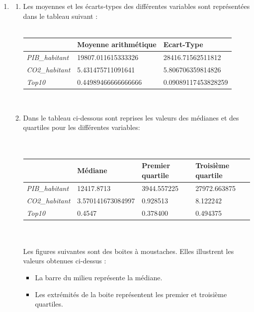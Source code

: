 \documentclass[a4paper, 11pt]{article}
\begin{document}
\begin{enumerate}[label=(\alph*)]
    \item
    \begin{enumerate}[label=\roman*.]
        \item Les moyennes et les écarts-types des différentes variables sont représentées dans le tableau suivant :\\\\ 
        \begin{tabular}{|p{4cm}||p{4cm}|p{4cm}|}
        \hline
             & \textbf{Moyenne arithmétique} & \textbf{Ecart-Type}\\
             \hline \hline
              \textit{PIB\_habitant} &  19807.011615333326 & 28416.71562511812\\
              \hline
              \textit{CO2\_habitant} & 5.431475711091641 & 5.806706359814826\\
              \hline
              \textit{Top10} & 0.44989466666666666 & 0.09089117453828259\\
              \hline
        \end{tabular}\\
        \item Dans le tableau ci-dessous sont reprises les valeurs des médianes et des quartiles pour les différentes variables: \\\\\
        \begin{tabular}{|p{2.5cm}||p{3cm}|p{3cm}|p{3cm}|}
        \hline
             &  \textbf{Médiane}& \textbf{Premier quartile} &  \textbf{Troisième quartile}\\
             \hline \hline
             \textit{PIB\_habitant} &  12417.8713 &   3944.557225 & 27972.663875\\
             \hline
             \textit{CO2\_habitant}&  3.570141673084997 & 0.928513 & 8.122242
              \\
             \hline
             \textit{Top10}&  0.4547 &   0.378400 &   0.494375 \\
             \hline
        \end{tabular}\\\\
        Les figures suivantes sont des boites à moustaches. Elles illustrent les valeurs obtenues ci-dessus : 
        \begin{itemize}[leftmargin=2cm]
        \item La barre du milieu représente la médiane.
        \item Les extrémités de la boite représentent les premier et troisième quartiles.

\end{itemize}
\end{enumerate}
\end{enumerate}
\end{document}

